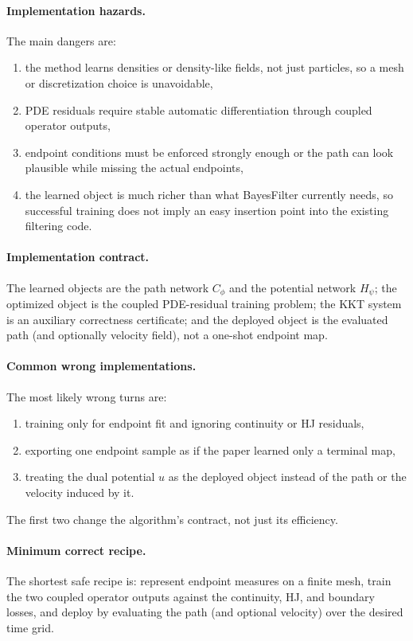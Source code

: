 \documentclass[11pt]{report}
\begin{document}
\paragraph{Implementation hazards.}
The main dangers are:
\begin{enumerate}[label=(\roman*)]
  \item the method learns densities or density-like fields, not just particles, so a mesh or discretization choice is unavoidable,
  \item PDE residuals require stable automatic differentiation through coupled operator outputs,
  \item endpoint conditions must be enforced strongly enough or the path can look plausible while missing the actual endpoints,
  \item the learned object is much richer than what BayesFilter currently needs, so successful training does not imply an easy insertion point into the existing filtering code.
\end{enumerate}

\paragraph{Implementation contract.}
The learned objects are the path network $C_\phi$ and the potential network $H_\psi$;
the optimized object is the coupled PDE-residual training problem; the KKT system is an
auxiliary correctness certificate; and the deployed object is the evaluated path (and
optionally velocity field), not a one-shot endpoint map.

\paragraph{Common wrong implementations.}
The most likely wrong turns are:
\begin{enumerate}[label=(\roman*)]
  \item training only for endpoint fit and ignoring continuity or HJ residuals,
  \item exporting one endpoint sample as if the paper learned only a terminal map,
  \item treating the dual potential $u$ as the deployed object instead of the path or the velocity induced by it.
\end{enumerate}
The first two change the algorithm's contract, not just its efficiency.

\paragraph{Minimum correct recipe.}
The shortest safe recipe is: represent endpoint measures on a finite mesh, train the two
coupled operator outputs against the continuity, HJ, and boundary losses, and deploy by
evaluating the path (and optional velocity) over the desired time grid.
\end{document}

